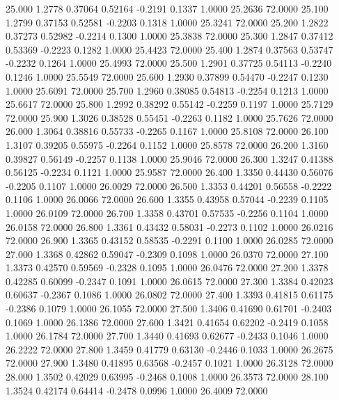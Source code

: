   25.000   1.2778   0.37064   0.52164  -0.2191   0.1337   1.0000  25.2636  72.0000
  25.100   1.2799   0.37153   0.52581  -0.2203   0.1318   1.0000  25.3241  72.0000
  25.200   1.2822   0.37273   0.52982  -0.2214   0.1300   1.0000  25.3838  72.0000
  25.300   1.2847   0.37412   0.53369  -0.2223   0.1282   1.0000  25.4423  72.0000
  25.400   1.2874   0.37563   0.53747  -0.2232   0.1264   1.0000  25.4993  72.0000
  25.500   1.2901   0.37725   0.54113  -0.2240   0.1246   1.0000  25.5549  72.0000
  25.600   1.2930   0.37899   0.54470  -0.2247   0.1230   1.0000  25.6091  72.0000
  25.700   1.2960   0.38085   0.54813  -0.2254   0.1213   1.0000  25.6617  72.0000
  25.800   1.2992   0.38292   0.55142  -0.2259   0.1197   1.0000  25.7129  72.0000
  25.900   1.3026   0.38528   0.55451  -0.2263   0.1182   1.0000  25.7626  72.0000
  26.000   1.3064   0.38816   0.55733  -0.2265   0.1167   1.0000  25.8108  72.0000
  26.100   1.3107   0.39205   0.55975  -0.2264   0.1152   1.0000  25.8578  72.0000
  26.200   1.3160   0.39827   0.56149  -0.2257   0.1138   1.0000  25.9046  72.0000
  26.300   1.3247   0.41388   0.56125  -0.2234   0.1121   1.0000  25.9587  72.0000
  26.400   1.3350   0.44430   0.56076  -0.2205   0.1107   1.0000  26.0029  72.0000
  26.500   1.3353   0.44201   0.56558  -0.2222   0.1106   1.0000  26.0066  72.0000
  26.600   1.3355   0.43958   0.57044  -0.2239   0.1105   1.0000  26.0109  72.0000
  26.700   1.3358   0.43701   0.57535  -0.2256   0.1104   1.0000  26.0158  72.0000
  26.800   1.3361   0.43432   0.58031  -0.2273   0.1102   1.0000  26.0216  72.0000
  26.900   1.3365   0.43152   0.58535  -0.2291   0.1100   1.0000  26.0285  72.0000
  27.000   1.3368   0.42862   0.59047  -0.2309   0.1098   1.0000  26.0370  72.0000
  27.100   1.3373   0.42570   0.59569  -0.2328   0.1095   1.0000  26.0476  72.0000
  27.200   1.3378   0.42285   0.60099  -0.2347   0.1091   1.0000  26.0615  72.0000
  27.300   1.3384   0.42023   0.60637  -0.2367   0.1086   1.0000  26.0802  72.0000
  27.400   1.3393   0.41815   0.61175  -0.2386   0.1079   1.0000  26.1055  72.0000
  27.500   1.3406   0.41690   0.61701  -0.2403   0.1069   1.0000  26.1386  72.0000
  27.600   1.3421   0.41654   0.62202  -0.2419   0.1058   1.0000  26.1784  72.0000
  27.700   1.3440   0.41693   0.62677  -0.2433   0.1046   1.0000  26.2222  72.0000
  27.800   1.3459   0.41779   0.63130  -0.2446   0.1033   1.0000  26.2675  72.0000
  27.900   1.3480   0.41895   0.63568  -0.2457   0.1021   1.0000  26.3128  72.0000
  28.000   1.3502   0.42029   0.63995  -0.2468   0.1008   1.0000  26.3573  72.0000
  28.100   1.3524   0.42174   0.64414  -0.2478   0.0996   1.0000  26.4009  72.0000
